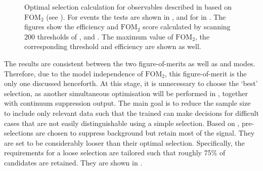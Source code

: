 \begin{figure}[htbp!]
{        }
    \caption{\label{fig:selection_optimisations} Optimal selection calculation for observables
    described in  based on $\mathrm{FOM}_2$ (see ).
    For \BptoXsgamma events the tests are shown
    in ,
    and for \BztoXsgamma in .
    The figures show the efficiency and $\mathrm{FOM}_2$ score calculated by scanning 200 thresholds of \piVeto, \etaVeto and \ZMVA.
    The maximum value of $\mathrm{FOM}_2$, the corresponding threshold and efficiency are shown as well.
    }
\end{figure}

The results are consistent between the two figure-of-merits as well as \Bp and \Bz modes.
Therefore, due to the model independence of $\mathrm{FOM}_2$, this figure-of-merit is the only one discussed henceforth.
At this stage, it is unnecessary to choose the `best' selection, 
as another simultaneous optimisation will be performed  in , together with continuum suppression \BDT output.
The main goal is to reduce the sample size to include only relevant data such that the trained \BDT can make decisions for difficult cases that are not easily distinguishable using a simple selection.
Based on , pre-selections are chosen to suppress background but retain most of the signal.
They are set to be considerably looser than their optimal selection.
Specifically, the requirements for a loose selection are tailored such that roughly 75\% of \BtoXsgamma candidates are retained.
They are shown in .

